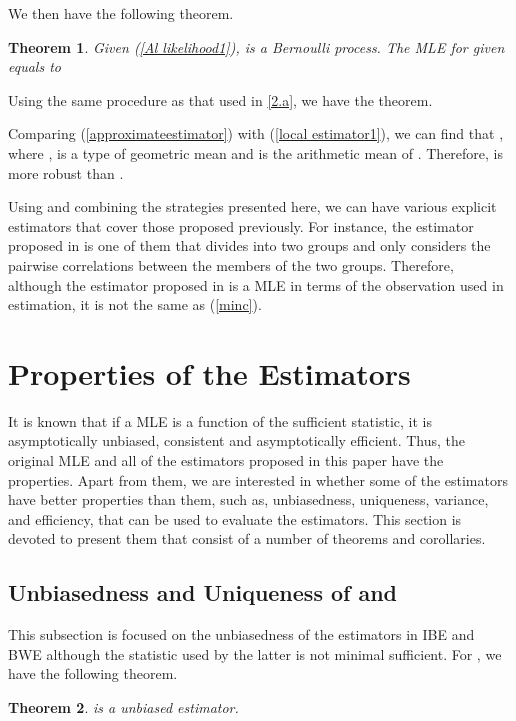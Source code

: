 \documentclass[10pt,onecolumn]{IEEEtran}
\newtheorem{theorem}{\bf Theorem}
\begin{document}
 We then have the following theorem.
\begin{theorem}  \label{local estimator}
Given (\ref{Al likelihood1}),  is a Bernoulli process. The MLE for  given  equals to

\end{theorem}
	\begin{IEEEproof} Using the same procedure as that used in \ref{2.a}, we have the theorem.
\end{IEEEproof}


Comparing (\ref{approximateestimator}) with (\ref{local estimator1}), we can find that , where , is a type of geometric mean and  is the arithmetic mean of . Therefore,  is more robust than .

Using and combining the strategies presented here, we can have various explicit estimators that cover those proposed previously. For instance, the estimator proposed in \cite{ADV07, Zhu11a} is one of them that divides  into two groups and only considers the pairwise correlations between the members of the two groups. Therefore, although the estimator proposed in \cite{ADV07, Zhu11a} is a MLE in terms of the observation used in estimation, it is not the same as (\ref{minc}).


\section{Properties of the Estimators} \label{section5}

 It is known that if a MLE is a function of the sufficient statistic, it is asymptotically unbiased, consistent and asymptotically efficient. Thus, the original MLE and
all of the estimators proposed in this paper have the properties. Apart from them, we are interested in whether some of the estimators have better properties
 than them, such as, unbiasedness, uniqueness, variance, and efficiency, that can be used to evaluate the estimators. This section is devoted to present them that consist of a number of  theorems and corollaries.

\subsection{Unbiasedness and Uniqueness of  and }
This subsection is focused on the unbiasedness of the estimators in IBE and BWE although the statistic used by the latter is not minimal sufficient. For , we have the following theorem.

 \begin{theorem} \label{local maximum}
 is a unbiased estimator.
\end{theorem}
\end{document}
